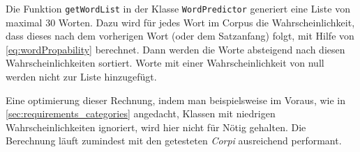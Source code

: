     Die Funktion \texttt{getWordList} in der Klasse \texttt{WordPredictor} generiert eine Liste von maximal 30 Worten. Dazu wird für jedes Wort im Corpus die Wahrscheinlichkeit, dass dieses nach dem vorherigen Wort (oder dem Satzanfang) folgt, mit Hilfe von \autoref{eq:wordPropability} berechnet. Dann werden die Worte absteigend nach diesen Wahrscheinlichkeiten sortiert. Worte mit einer Wahrscheinlichkeit von null werden nicht zur Liste hinzugefügt. 
    
    Eine optimierung dieser Rechnung, indem man beispielsweise im Voraus, wie in \autoref{sec:requirements_categories} angedacht, Klassen mit niedrigen Wahrscheinlichkeiten ignoriert, wird hier nicht für Nötig gehalten. Die Berechnung läuft zumindest mit den getesteten \emph{Corpi} ausreichend performant.
    
   
    
    
    
    
    
    
    
    
    
    
    
    
    
    
    
    
    
    
